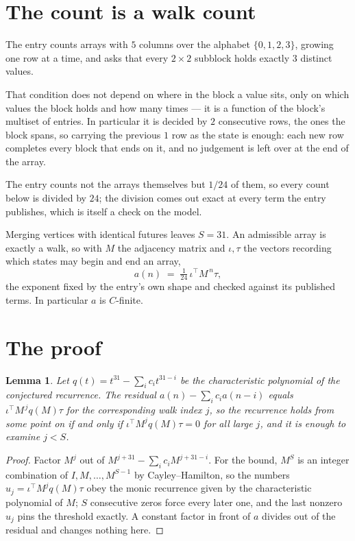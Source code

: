 \documentclass[11pt,a4paper]{article}
\theoremstyle{plain}
\newtheorem{lemma}[theorem]{Lemma}
\theoremstyle{definition}
\begin{document}
\section{The count is a walk count}

The entry counts arrays with $5$ columns over the alphabet $\{0,1,2,3\}$, growing one row at a time, and asks that every $2\times2$ subblock holds exactly $3$ distinct values.

That condition does not depend on where in the block a value sits, only on which values the block holds and how many times --- it is a function of the block's multiset of entries. In particular it is decided by $2$ consecutive rows, the ones the block spans, so carrying the previous $1$ row as the state is enough: each new row completes every block that ends on it, and no judgement is left over at the end of the array.

The entry counts not the arrays themselves but $1/24$ of them, so every count below is divided by $24$; the division comes out exact at every term the entry publishes, which is itself a check on the model.

Merging vertices with identical futures leaves $S=31$. An admissible array is exactly a walk, so with $M$ the adjacency matrix and $\iota,\tau$ the vectors recording which states may begin and end an array,
\[
a(n)\;=\;\tfrac{1}{24}\,\iota^{\!\top}M^{\,n}\tau ,
\]
the exponent fixed by the entry's own shape and checked against its published terms. In
particular $a$ is $C$-finite.

\section{The proof}

\begin{lemma}\label{lem:crit}
Let $q(t)=t^{31}-\sum_i c_it^{31-i}$ be the characteristic polynomial of the
conjectured recurrence. The residual $a(n)-\sum_ic_ia(n-i)$ equals
$\iota^{\!\top}M^{\,j}q(M)\tau$ for the corresponding walk index $j$, so the recurrence
holds from some point on if and only if $\iota^{\!\top}M^{j}q(M)\tau=0$ for all large $j$,
and it is enough to examine $j<S$.
\end{lemma}

\begin{proof}
Factor $M^{j}$ out of $M^{j+31}-\sum_ic_iM^{j+31-i}$. For the bound, $M^{S}$
is an integer combination of $I,M,\dots,M^{S-1}$ by Cayley--Hamilton, so the numbers
$u_j=\iota^{\!\top}M^{j}q(M)\tau$ obey the monic recurrence given by the characteristic
polynomial of $M$; $S$ consecutive zeros force every later one, and the last nonzero $u_j$
pins the threshold exactly. A constant factor in front of $a$ divides out of the residual and
changes nothing here.
\end{proof}
\end{document}
